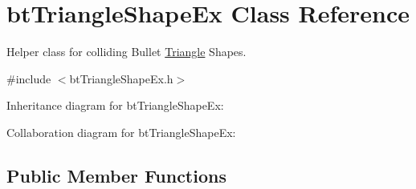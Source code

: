\hypertarget{classbt_triangle_shape_ex}{\section{bt\+Triangle\+Shape\+Ex Class Reference}
\label{classbt_triangle_shape_ex}
}


Helper class for colliding Bullet \hyperlink{class_triangle}{Triangle} Shapes.  




{\ttfamily \#include $<$bt\+Triangle\+Shape\+Ex.\+h$>$}



Inheritance diagram for bt\+Triangle\+Shape\+Ex\+:


Collaboration diagram for bt\+Triangle\+Shape\+Ex\+:
\subsection*{Public Member Functions}
